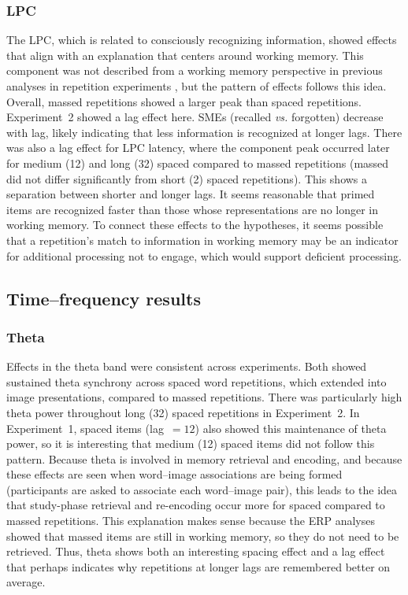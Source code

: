 \subsubsection{LPC}



The LPC, which is related to consciously recognizing information, showed effects that align with an explanation that centers around working memory.  This component was not described from a working memory perspective in previous analyses in repetition experiments \cite[rather, they discussed it as ``template matching'']{OlicEtal2000,VanSEtal2007}, but the pattern of effects follows this idea.  Overall, massed repetitions showed a larger peak than spaced repetitions.
Experiment~2 showed a lag effect here.  SMEs (recalled \textit{vs.} forgotten) decrease with lag, likely indicating that less information is recognized at longer lags.
There was also a lag effect for LPC latency, where the component peak occurred later for medium (12) and long (32) spaced compared to massed repetitions (massed did not differ significantly from short (2) spaced repetitions).  This shows a separation between shorter and longer lags.  It seems reasonable that primed items are recognized faster than those whose representations are no longer in working memory.  To connect these effects to the hypotheses, it seems possible that a repetition's match to information in working memory may be an indicator for additional processing not to engage, which would support deficient processing.

\subsection{Time--frequency results}

\subsubsection{Theta}

Effects in the theta band were consistent across experiments.  Both showed sustained theta synchrony across spaced word repetitions, which extended into image presentations, compared to massed repetitions.  There was particularly high theta power throughout long (32) spaced repetitions in Experiment~2.  In Experiment~1, spaced items (lag~$=12$) also showed this maintenance of theta power, so it is interesting that medium (12) spaced items did not follow this pattern.  Because theta is involved in memory retrieval and encoding, and because these effects are seen when word--image associations are being formed (participants are asked to associate each word--image pair), this leads to the idea that study-phase retrieval and re-encoding occur more for spaced compared to massed repetitions.  This explanation makes sense because the ERP analyses showed that massed items are still in working memory, so they do not need to be retrieved.
Thus, theta shows both an interesting spacing effect and a lag effect that perhaps indicates why repetitions at longer lags are remembered better on average.

